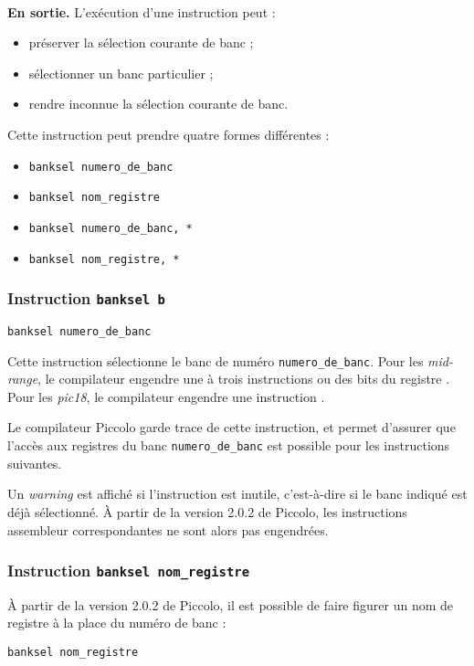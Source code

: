 ~\\
\textbf{En sortie.} L'exécution d'une instruction peut :
\begin{itemize}
  \item préserver la sélection courante de banc ;
  \item sélectionner un banc particulier ;
  \item rendre inconnue la sélection courante de banc.
\end{itemize}


Cette instruction peut prendre quatre formes différentes :
\begin{itemize}
  \item \texttt{banksel numero\_de\_banc}
  \item \texttt{banksel nom\_registre}
  \item \texttt{banksel numero\_de\_banc, *}
  \item \texttt{banksel nom\_registre, *}
\end{itemize}


\subsubsection{Instruction \texttt{banksel b}}
\begin{lstlisting}[language=piccolo]
banksel numero_de_banc
\end{lstlisting}

Cette instruction sélectionne le banc de numéro \texttt{numero\_de\_banc}. Pour les \emph{mid-range}, le compilateur engendre une à trois instructions  ou  des bits  du registre . Pour les \emph{pic18}, le compilateur engendre une instruction .

Le compilateur Piccolo garde trace de cette instruction, et permet d'assurer que l'accès aux registres du banc \texttt{numero\_de\_banc} est possible pour les instructions suivantes.

Un \emph{warning} est affiché si l'instruction est inutile, c'est-à-dire si le banc indiqué est déjà sélectionné. À partir de la version 2.0.2 de Piccolo, les instructions assembleur correspondantes ne sont alors pas engendrées.






\subsubsection{Instruction \texttt{banksel nom\_registre}}
À partir de la version 2.0.2 de Piccolo, il est possible de faire figurer un nom de registre à la place du numéro de banc :
\begin{lstlisting}[language=piccolo]
banksel nom_registre
\end{lstlisting}

